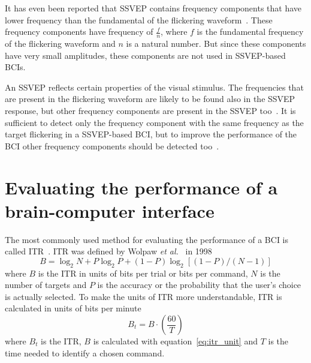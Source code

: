 It has even been reported that \gls{SSVEP} contains \glspl{frequency component} that have lower frequency than the \gls{fundamental} of the \gls{flickering waveform}~\cite{ssvep_response}. These \glspl{frequency component} have frequency of $\frac{f}{n}$, where $f$ is the \gls{fundamental} frequency of the \gls{flickering waveform} and $n$ is a natural number. But since these components have very small amplitudes, these components are not used in \gls{SSVEP}-based \glspl{BCI}.

An \gls{SSVEP} reflects certain properties of the visual stimulus. The frequencies that are present in the \gls{flickering waveform} are likely to be found also in the \gls{SSVEP} response, but other \glspl{frequency component} are present in the \gls{SSVEP} too~\cite{square_sine}. It is sufficient to detect only the \gls{frequency component} with the same frequency as the \gls{target} \gls{flickering} in a \gls{SSVEP}-based \gls{BCI}, but to improve the performance of the \gls{BCI} other \glspl{frequency component} should be detected too~\cite{harmonic_imrpovement}.


\section{Evaluating the performance of a brain-computer interface}

The most commonly used method for evaluating the performance of a \gls{BCI} is called \gls{ITR}~\cite{itr}. \gls{ITR} was defined by Wolpaw \textit{et al.}~\cite{itr_wolpaw} in 1998
\begin{equation}
	\label{eq:itr_unit}
	B=\log_2 N+ P\log_2 P +(1-P)\log_2[(1-P)/(N-1)]
\end{equation}
where $B$ is the \gls{ITR} in units of bits per trial or bits per command, $N$ is the number of targets and $P$ is the accuracy or the probability that the user's choice is actually selected. To make the units of \gls{ITR} more understandable, \gls{ITR} is calculated in units of bits per minute~\cite{itr_wolpaw}
\begin{equation}
	\label{eq:itr}
	B_t=B\cdot(\frac{60}{T})
\end{equation}
where $B_t$ is the \gls{ITR}, $B$ is calculated with equation~\ref{eq:itr_unit} and $T$ is the time needed to identify a chosen command.

